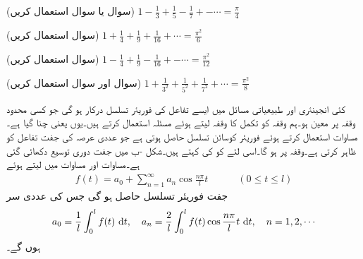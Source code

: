 \quad(سوال  یا سوال   استعمال کریں) \quad 
$1-\tfrac{1}{3}+\tfrac{1}{5}-\tfrac{1}{7}+-\cdots=\tfrac{\pi}{4}$

\quad(سوال  استعمال کریں) \quad
$1+\tfrac{1}{4}+\tfrac{1}{9}+\tfrac{1}{16}+\cdots=\tfrac{\pi^2}{6}$

\quad(سوال  استعمال کریں) \quad 
$1-\tfrac{1}{4}+\tfrac{1}{9}-\tfrac{1}{16}+-\cdots=\tfrac{\pi^2}{12}$

\quad(سوال  اور سوال  استعمال کریں) \quad 
$1+\tfrac{1}{3^2}+\tfrac{1}{5^2}+\tfrac{1}{7^2}+\cdots=\tfrac{\pi^2}{8}$


کئی انجینئری اور طبیعیاتی مسائل میں ایسے تفاعل  کی فوریئر تسلسل درکار ہو گی جو کسی محدود وقفہ   پر معین ہو۔ہم وقفہ  کو تکمل کا وقفہ  لیتے ہوئے مسئلہ  استعمال کرتے ہیں۔یوں  یعنی  چنا گیا ہے۔ مساوات  استعمال کرتے ہوئے فوریئر کوسائن تسلسل حاصل ہوتی ہے جو  عددی عرصہ کی جفت تفاعل   کو ظاہر کرتی ہے۔وقفہ   پر  ہو گا۔اسی لئے  کو  کی  کہتے ہیں۔شکل -ب میں جفت دوری توسیع دکھائی گئی ہے۔مساوات  اور مساوات  میں  لیتے ہوئے 
\begin{align}\label{مساوات_فوریئر_نصف_حلقہ_توسیع_جفت}
f(t)=a_0+\sum_{n=1}^{\infty} a_n\cos \frac{n\pi}{l}t\quad \quad \quad (0\le t\le l)
\end{align}
جفت فوریئر تسلسل حاصل ہو گی جس کی عددی سر
\begin{align}\label{مساوات_فوریئر_نصف_حلقہ_توسیع_جفت_عددی_سر}
a_0=\frac{1}{l}\int_{0}^{l}f(t)\,\dif t,\quad a_n=\frac{2}{l}\int_0^l f(t)\cos \frac{n\pi}{l}t\,\dif t,\quad n=1,2,\cdots
\end{align}
ہوں گے۔

